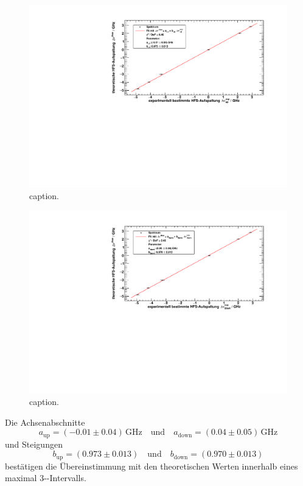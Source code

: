 \begin{figure}[H]
\begin{center}
    \includegraphics[width=\textwidth]{../img/part2/up-spectrum.pdf}
    \caption{caption.}
    \label{img:hfs:spectrum:up}
\end{center}
\end{figure}

\begin{figure}[H]
\begin{center}
    \includegraphics[width=\textwidth]{../img/part2/down-spectrum.pdf}
    \caption{caption.}
    \label{img:hfs:spectrum:down}
\end{center}
\end{figure}
Die Achsenabschnitte 
\begin{equation}
    a_\text{up} = (-0.01 \pm 0.04)\,\text{GHz} \quad \text{und} \quad a_\text{down} = (0.04 \pm 0.05)\,\text{GHz}
\end{equation}
und Steigungen
\begin{equation}
    b_\text{up} = (0.973 \pm 0.013) \quad \text{und} \quad b_\text{down} = (0.970 \pm 0.013)
\end{equation}
bestätigen die Übereinstimmung mit den theoretischen Werten innerhalb eines maximal 3-\textsigma-Intervalls.

